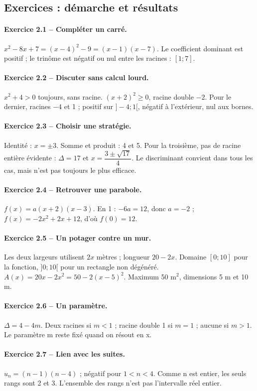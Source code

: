 \subsection*{Exercices : démarche et résultats}
\paragraph{Exercice 2.1 -- Compléter un carré.} $x^2-8x+7=(x-4)^2-9=(x-1)(x-7)$. Le coefficient dominant est positif ; le trinôme est négatif ou nul entre les racines : $[1;7]$.
\paragraph{Exercice 2.2 -- Discuter sans calcul lourd.} $x^2+4>0$ toujours, sans racine. $(x+2)^2\geq0$, racine double $-2$. Pour le dernier, racines $-4$ et 1 ; positif sur $]-4;1[$, négatif à l’extérieur, nul aux bornes.
\paragraph{Exercice 2.3 -- Choisir une stratégie.} Identité : $x=\pm3$. Somme et produit : 4 et 5. Pour la troisième, pas de racine entière évidente : $\Delta=17$ et $x=\dfrac{3\pm\sqrt{17}}{4}$. Le discriminant convient dans tous les cas, mais n’est pas toujours le plus efficace.
\paragraph{Exercice 2.4 -- Retrouver une parabole.} $f(x)=a(x+2)(x-3)$. En 1 : $-6a=12$, donc $a=-2$ ; $f(x)=-2x^2+2x+12$, d’où $f(0)=12$.
\paragraph{Exercice 2.5 -- Un potager contre un mur.} Les deux largeurs utilisent $2x$ mètres ; longueur $20-2x$. Domaine $[0;10]$ pour la fonction, $]0;10[$ pour un rectangle non dégénéré. $A(x)=20x-2x^2=50-2(x-5)^2$. Maximum 50 m$^2$, dimensions 5 m et 10 m.
\paragraph{Exercice 2.6 -- Un paramètre.} $\Delta=4-4m$. Deux racines si $m<1$ ; racine double 1 si $m=1$ ; aucune si $m>1$. Le paramètre m reste fixé quand on résout en x.
\paragraph{Exercice 2.7 -- Lien avec les suites.} $u_n=(n-1)(n-4)$ ; négatif pour $1<n<4$. Comme n est entier, les seuls rangs sont 2 et 3. L’ensemble des rangs n’est pas l’intervalle réel entier.
